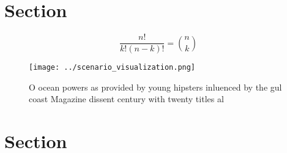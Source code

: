 \documentclass[a4paper]{article}
\begin{document}
\section{Section}

\[ \frac{n!}{k!(n-k)!} = \binom{n}{k} \]

\begin{figure}
\centering
\texttt{[image: ../scenario\_visualization.png]}
\caption{O ocean powers as provided by young hipsters inluenced by the gul coast Magazine dissent century with twenty titles al 
}
\end{figure}
 
\section{Section}
\end{document}
